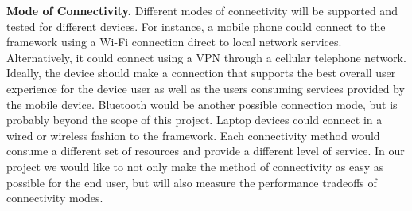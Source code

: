 \textbf{Mode of Connectivity.}
Different modes of connectivity will be supported and tested for different devices.
For instance, a mobile phone could connect to the framework using a Wi-Fi connection direct to local network services.
Alternatively, it could connect using a VPN through a cellular telephone network.
Ideally, the device should make a connection that supports the best overall user experience for the device user as well as the users consuming services provided by the mobile device.  Bluetooth would be another possible connection mode, but is probably beyond the scope of this project.   Laptop devices could connect in a wired or wireless fashion to the framework. Each connectivity method would consume a different set of resources and provide a different level of service.  In our project we would like to not only make the method of connectivity as easy as possible for the end user, but will also measure the performance tradeoffs of connectivity modes.


